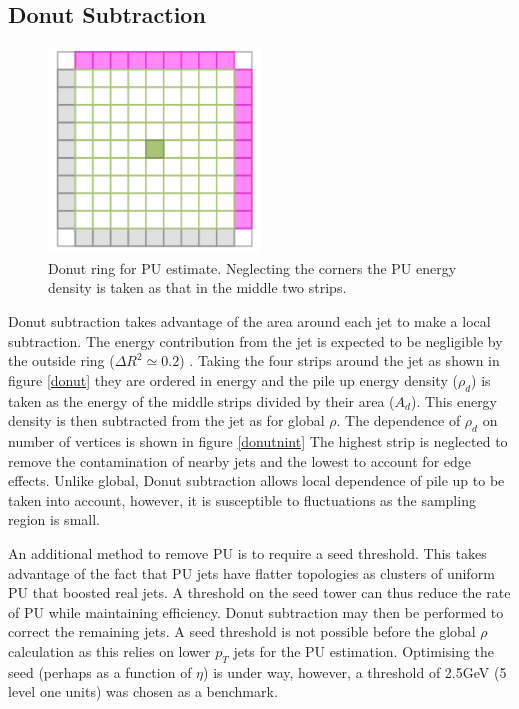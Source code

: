 \subsection{Donut Subtraction}
\begin{figure}
\centering
    \includegraphics[width=0.5\textwidth]{Figures/donut}
  \caption{Donut ring for PU estimate. Neglecting the corners the PU energy density is taken as that in the middle two strips.}
  \label{mask}
\end{figure}  
Donut subtraction takes advantage of the area around each jet to make a local subtraction. The energy contribution from the jet is expected to be negligible by the outside ring ($\Delta R^2\simeq 0.2$) \cite{jetmet}. Taking the four strips around the jet as shown in figure \ref{donut} they are ordered in energy and the pile up energy density ($\rho_d$) is taken as the energy of the middle strips divided by their area ($A_d$). This energy density is then subtracted from the jet as for global $\rho$. The dependence of $\rho_d$ on number of vertices is shown in figure \ref{donutnint} The highest strip is neglected to remove the contamination of nearby jets and the lowest to account for edge effects. Unlike global, Donut subtraction allows local dependence of pile up to be taken into account, however, it is susceptible to fluctuations as the sampling region is small.

An additional method to remove PU is to require a seed threshold. This takes advantage of the fact that PU jets have flatter topologies as clusters of uniform PU that boosted real jets. A threshold on the seed tower can thus reduce the rate of PU while maintaining efficiency. Donut subtraction may then be performed to correct the remaining jets. A seed threshold is not possible before the global $\rho$ calculation as this relies on lower $p_{T}$ jets for the PU estimation. Optimising the seed (perhaps as a function of $\eta$) is under way, however, a threshold of 2.5GeV (5 level one units) was chosen as a benchmark.

